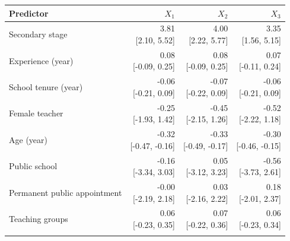 \begin{tabular}{@{}p{4.5cm}rrr@{}}
\toprule
Predictor & $X_1$ & $X_2$ & $X_3$ \\
\midrule
Secondary stage & \shortstack{3.81\\{[2.10, 5.52]}} & \shortstack{4.00\\{[2.22, 5.77]}} & \shortstack{3.35\\{[1.56, 5.15]}} \\\addlinespace[2pt]
Experience (year) & \shortstack{0.08\\{[-0.09, 0.25]}} & \shortstack{0.08\\{[-0.09, 0.25]}} & \shortstack{0.07\\{[-0.11, 0.24]}} \\\addlinespace[2pt]
School tenure (year) & \shortstack{-0.06\\{[-0.21, 0.09]}} & \shortstack{-0.07\\{[-0.22, 0.09]}} & \shortstack{-0.06\\{[-0.21, 0.09]}} \\\addlinespace[2pt]
Female teacher & \shortstack{-0.25\\{[-1.93, 1.42]}} & \shortstack{-0.45\\{[-2.15, 1.26]}} & \shortstack{-0.52\\{[-2.22, 1.18]}} \\\addlinespace[2pt]
Age (year) & \shortstack{-0.32\\{[-0.47, -0.16]}} & \shortstack{-0.33\\{[-0.49, -0.17]}} & \shortstack{-0.30\\{[-0.46, -0.15]}} \\\addlinespace[2pt]
Public school & \shortstack{-0.16\\{[-3.34, 3.03]}} & \shortstack{0.05\\{[-3.12, 3.23]}} & \shortstack{-0.56\\{[-3.73, 2.61]}} \\\addlinespace[2pt]
Permanent public appointment & \shortstack{-0.00\\{[-2.19, 2.18]}} & \shortstack{0.03\\{[-2.16, 2.22]}} & \shortstack{0.18\\{[-2.01, 2.37]}} \\\addlinespace[2pt]
Teaching groups & \shortstack{0.06\\{[-0.23, 0.35]}} & \shortstack{0.07\\{[-0.22, 0.36]}} & \shortstack{0.06\\{[-0.23, 0.34]}} \\\addlinespace[2pt]

\end{tabular}
